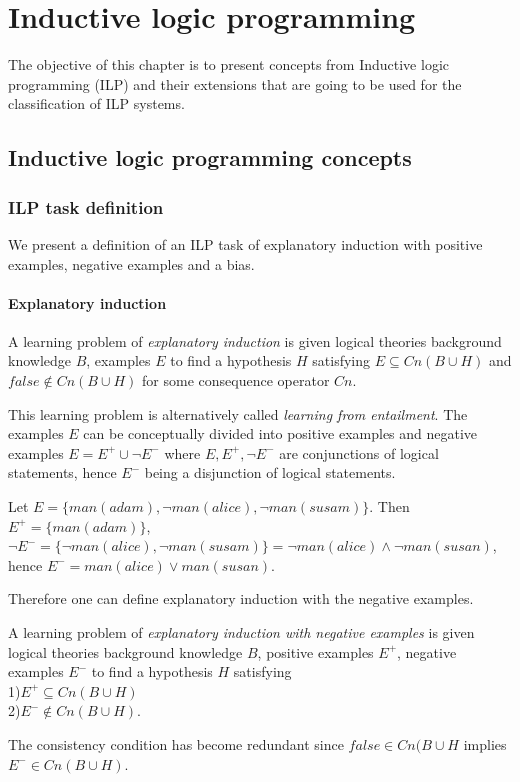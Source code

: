 \chapter{Inductive logic programming}\label{ch:inductive_logic_programming}
The objective of this chapter is to present concepts from Inductive logic programming (ILP) and their extensions that are going to be used for the classification of ILP systems.

\section{Inductive logic programming concepts}

\subsection{ILP task definition}
We present a definition of an ILP task of explanatory induction with positive examples, negative examples and a bias.

\subsubsection{Explanatory induction\cite{yamamoto2012inverse}}
\begin{defn}\cite{flach1996rationality} A learning problem of \emph{explanatory induction} is given logical theories background knowledge $B$, examples $E$ to find a hypothesis $H$ satisfying $E \subseteq Cn(B \cup H)$ and $false \not\in Cn(B \cup H)$ for some consequence operator $Cn$.
\end{defn}

This learning problem is alternatively called \emph{learning from entailment}\cite{muggleton1995inverse}\cite{de1997logical}. The examples $E$ can be conceptually divided into positive examples and negative examples $E=E^{+} \cup \neg E^{-}$ where $E, E^{+}, \neg E^{-}$ are conjunctions of logical statements, hence $E^{-}$ being a disjunction of logical statements.

\begin{exmp}\cite{explanatory_induction_example}
Let $E=\{man(adam), \neg man(alice), \neg man(susam)\}$. Then $E^{+}=\{man(adam)\}$,
$\neg E^{-} = \{\neg man(alice), \neg man(susam)\}=\neg man(alice) \land \neg man(susan)$, hence
$E^{-} = man(alice) \lor man(susan)$.
\end{exmp}

Therefore one can define explanatory induction with the negative examples.
\begin{defn}\label{explanatory_induction_with_negative_examples_definition}
A learning problem of \emph{explanatory induction with negative examples} is given logical theories background knowledge $B$, positive examples $E^{+}$, negative examples $E^{-}$ to find a hypothesis $H$ satisfying\\
1)$E^{+} \subseteq Cn(B \cup H)$\\
2)$E^{-} \not\in Cn(B \cup H)$.
\end{defn}
The consistency condition has become redundant since $false \in Cn(B \cup H$ implies $E^{-} \in Cn(B \cup H)$.

